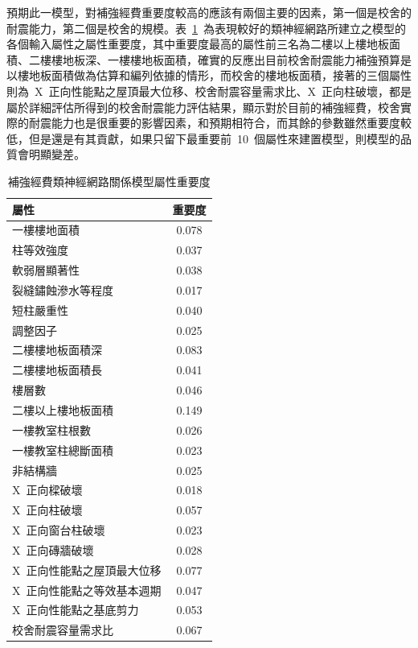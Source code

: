預期此一模型，對補強經費重要度較高的應該有兩個主要的因素，第一個是校舍的耐震能力，第二個是校舍的規模。表~\ref{tab:cost_result_importance}~為表現較好的類神經網路所建立之模型的各個輸入屬性之屬性重要度，其中重要度最高的屬性前三名為二樓以上樓地板面積、二樓樓地板深、一樓樓地板面積，確實的反應出目前校舍耐震能力補強預算是以樓地板面積做為估算和編列依據的情形，而校舍的樓地板面積，接著的三個屬性則為~X~正向性能點之屋頂最大位移、校舍耐震容量需求比、X~正向柱破壞，都是屬於詳細評估所得到的校舍耐震能力評估結果，顯示對於目前的補強經費，校舍實際的耐震能力也是很重要的影響因素，和預期相符合，而其餘的參數雖然重要度較低，但是還是有其貢獻，如果只留下最重要前~10~個屬性來建置模型，則模型的品質會明顯變差。

{\renewcommand{\arraystretch}{1.5}
\begin{table}[hbtp]
  \begin{center}
    \caption{補強經費類神經網路關係模型屬性重要度}
    \label{tab:cost_result_importance}
    \footnotesize
    \begin{tabular}{l c}
      \hline
       屬性 & 重要度 \\
      \hline
       一樓樓地面積 & 0.078 \\
      \hline
       柱等效強度 & 0.037 \\
      \hline
       軟弱層顯著性 & 0.038 \\
      \hline
       裂縫鏽蝕滲水等程度 & 0.017 \\
      \hline
       短柱嚴重性 & 0.040 \\
      \hline
       調整因子 & 0.025 \\
      \hline
       二樓樓地板面積深 & 0.083 \\
      \hline
       二樓樓地板面積長 & 0.041 \\
      \hline
       樓層數 & 0.046 \\
      \hline
       二樓以上樓地板面積 & 0.149 \\
      \hline
       一樓教室柱根數 & 0.026 \\
      \hline
       一樓教室柱總斷面積 & 0.023 \\
      \hline
       非結構牆 & 0.025 \\
      \hline
       X~正向樑破壞 & 0.018  \\
      \hline
       X~正向柱破壞 & 0.057 \\
      \hline
       X~正向窗台柱破壞 & 0.023 \\
      \hline
       X~正向磚牆破壞 & 0.028 \\
      \hline
       X~正向性能點之屋頂最大位移 & 0.077 \\
      \hline
       X~正向性能點之等效基本週期 & 0.047 \\
      \hline
       X~正向性能點之基底剪力 & 0.053 \\
      \hline
       校舍耐震容量需求比 & 0.067 \\
      \hline
    \end{tabular}
  \end{center}
\end{table}
}


